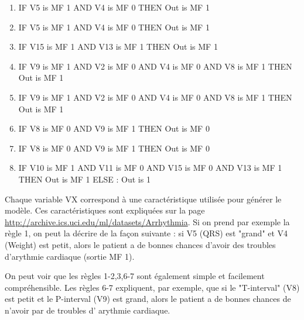 \begin{enumerate}
  \item IF V5 is MF 1 AND V4 is MF 0 THEN Out is MF 1
  \item IF V5 is MF 1 AND V4 is MF 0 THEN Out is MF 1
  \item IF V15 is MF 1 AND V13 is MF 1 THEN Out is MF 1
  \item IF V9 is MF 1 AND V2 is MF 0 AND V4 is MF 0 AND V8 is MF 1 THEN Out is MF 1
  \item IF V9 is MF 1 AND V2 is MF 0 AND V4 is MF 0 AND V8 is MF 1 THEN Out is MF 1
  \item IF V8 is MF 0 AND V9 is MF 1 THEN Out is MF 0
  \item IF V8 is MF 0 AND V9 is MF 1 THEN Out is MF 0
  \item IF V10 is MF 1 AND V11 is MF 0 AND V15 is MF 0 AND V13 is MF 1 THEN Out is MF 1 ELSE : Out is 1  
\end{enumerate}


Chaque variable VX correspond à une caractéristique utilisée pour générer le modèle. Ces caractéristiques sont expliquées sur la page \url{http://archive.ics.uci.edu/ml/datasets/Arrhythmia}.
Si on prend par exemple la règle 1, on peut la décrire de la façon suivante : si V5 (QRS) est "grand" et V4 (Weight) est petit, alors le patient a de bonnes chances d'avoir des troubles d'arythmie cardiaque (sortie MF 1).

On peut voir que les règles 1-2,3,6-7 sont également simple et facilement compréhensible. 
Les règles 6-7 expliquent, par exemple, que si le "T-interval" (V8) est petit et le P-interval (V9) est grand, alors le patient a de bonnes chances de n'avoir par de troubles d' arythmie cardiaque.


 
 
 
 
 
 

